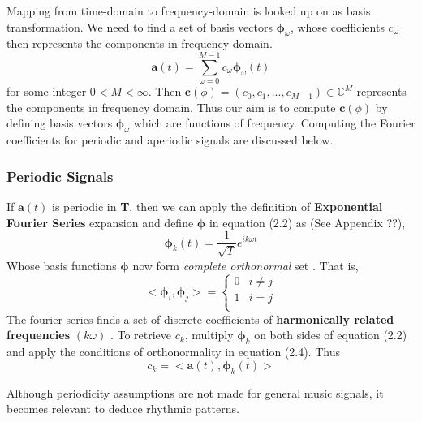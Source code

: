 \noindent Mapping from time-domain to frequency-domain is looked up on as \gls{basis transformation}. We need to find a set of basis vectors $\bm{\phi}_{ \omega }$, whose coefficients $c_{ \omega }$ then represents the components in frequency domain. 
\begin{equation}
\textbf{a}(t) = \displaystyle\sum_{ \omega =0}^{M-1}c_{ \omega }\bm{\phi}_{ \omega }(t) 
\end{equation}
for some integer $0 < M < \infty$. Then $\textbf{c}(\phi) = (c_{0},c_{1}, ...,c_{M-1}) \in \mathbb{C}^M $ represents the components in frequency domain. Thus our aim is to compute $\textbf{c}(\phi)$ by defining basis vectors $\bm{\phi}_{\omega}$ which are functions of frequency. Computing the Fourier coefficients for periodic and aperiodic signals are discussed below.

\subsubsection{Periodic Signals}
If $\textbf{a}(t)$ is periodic in \textbf{T}, then we can apply the definition of \textbf{Exponential Fourier Series} expansion and define $\bm{\phi}$ in equation (2.2) as (See Appendix ??),
\begin{equation}
\bm{\phi}_{k}(t) = \frac{1}{\sqrt{T}}e^{ik \omega t}
\end{equation}    
Whose basis functions $\bm{\phi}$ now form \textit{complete orthonormal} set \cite{allen}. That is, 
\begin{equation}
 < \bm{\phi}_{i}, \bm{\phi}_{j} > =
	\begin{cases}
	  0 & i \neq j \\
	  1 &  i = j \\ 
	\end{cases}
\end{equation}
The fourier series finds a set of discrete coefficients of \textbf{harmonically related frequencies} $(k \omega )$ . To retrieve $c_{k}$, multiply $\bm{\phi}_{k}$ on both sides of equation (2.2) and apply the conditions of orthonormality in equation (2.4). Thus
\begin{equation}
c_{k} = <\textbf{a}(t), \bm{\phi}_{k}(t)>
\end{equation}

Although periodicity assumptions are not made for general music signals, it becomes relevant to deduce rhythmic patterns. 


